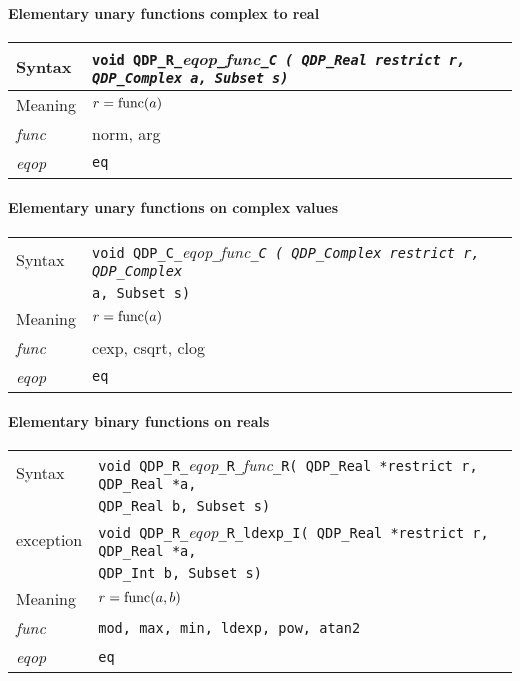 \documentclass{article}
\newcommand{\tReal}{QDP\ttdash Real }
\newcommand{\tComplex}{QDP\ttdash Complex }
\newcommand{\tInt}{QDP\ttdash Int }
\newcommand{\namespace}{QDP}
\newcommand{\ttdash}{{\tt \_}}
\newcommand{\extraarg}{, Subset s}
\newcommand{\protoUnaryQualCC}[1]{{\tt void \namespace}\ttdash{\tt C}\ttdash{\it eqop}\ttdash#1\ttdash{\tt C ( \tComplex }{\tt *restrict r, \tComplex }\\
       &  {\tt *a\extraarg)}}
\newcommand{\protoUnaryQualRC}[1]{{\tt void \namespace}\ttdash{\tt R}\ttdash{\it eqop}\ttdash#1\ttdash{\tt C ( \tReal }{\tt *restrict r, \tComplex }{\tt *a\extraarg)}}
\begin{document}
\paragraph{Elementary unary functions complex to real}

\begin{flushleft}
  \begin{tabular}{|l|l|}
  \hline
  Syntax      & \protoUnaryQualRC{\it func}  \\
  \hline
  Meaning     & $r = {\rm func}(a)$ \\
  \hline
  {\it func}  & norm, arg \\
  \hline
  {\it eqop}  & {\tt eq} \\
  \hline
  \end{tabular}
\end{flushleft}

\paragraph{Elementary unary functions on complex values}

\begin{flushleft}
  \begin{tabular}{|l|l|}
  \hline
  Syntax      & \protoUnaryQualCC{\it func}  \\
  \hline
  Meaning     & $r = {\rm func}(a)$ \\
  \hline
  {\it func}  & cexp, csqrt, clog \\
  \hline
  {\it eqop}  & {\tt eq} \\
  \hline
  \end{tabular}
\end{flushleft}

\paragraph{Elementary binary functions on reals}

\begin{flushleft}
  \begin{tabular}{|l|l|}
  \hline
  Syntax      & {\tt void \namespace}\ttdash{\tt R}\ttdash{\it eqop}\ttdash{\tt R}\ttdash{\it func}\ttdash{\tt R( \tReal *restrict r, \tReal *a,}\\
              & {\tt \tReal }{\tt *b\extraarg)} \\
  exception   & {\tt void \namespace}\ttdash{\tt R}\ttdash{\it eqop}\ttdash{\tt R}\ttdash{\tt ldexp}\ttdash{\tt I( \tReal *restrict r, \tReal *a,}\\
              & {\tt \tInt }{\tt *b\extraarg)} \\
  \hline
  Meaning     & $r = {\rm func}(a,b)$ \\
  \hline
  {\it func}  & {\tt  mod, max, min, ldexp, pow, atan2} \\
  \hline
  {\it eqop}  & {\tt eq} \\
  \hline
  \end{tabular}
\end{flushleft}
\end{document}

